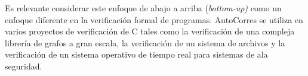 Es relevante considerar este enfoque de abajo a arriba (\textit{bottom-up)} como un enfoque diferente en la verificación formal de programas.
AutoCorres se utiliza en varios proyectos de verificación de C tales como la verificación de una compleja librería de grafos a gran escala, la verificación de un sistema de archivos y la verificación de un sistema operativo de tiempo real para sistemas de ala seguridad.
